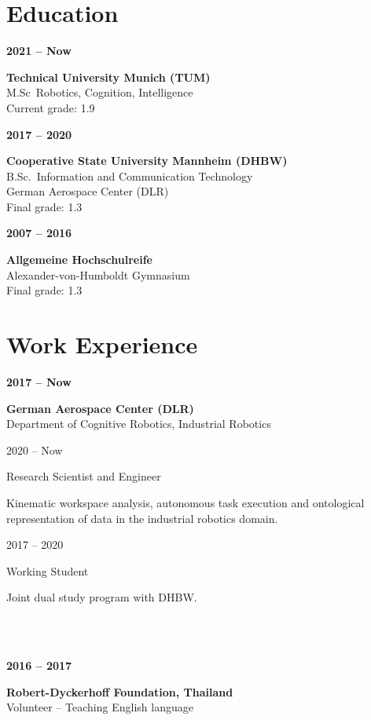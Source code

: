 \documentclass[a4paper, 10pt]{article}
\newcommand{\CVEntry}[3]{
    \begin{minipage}[t]{0.23\textwidth}
        \textbf{#1}
    \end{minipage}%
    \begin{minipage}[t]{0.76\textwidth}
        \textbf{#2}\\
        #3
    \end{minipage}%
}
\newcommand{\CVSubEntry}[2]{
    \begin{minipage}[t]{0.23\textwidth}
        \vspace{3pt}
        \hspace{8pt}#1
    \end{minipage}%
    \begin{minipage}[t]{0.76\textwidth}
        \vspace{3pt}
        #2
    \end{minipage}%
}
\begin{document}
\begin{tcbraster}[raster columns=7]
\begin{tcolorbox}[left=1cm, height=1.0\textheight, colback=white, raster multicolumn=5, boxrule=0pt, frame empty, nobeforeafter]
    \section*{Education}
    \CVEntry{2021 -- Now}{Technical University Munich (TUM)}{
        M.Sc\ Robotics, Cognition, Intelligence\\
        Current grade: 1.9\\
    }
    \CVEntry{2017 -- 2020}{Cooperative State University Mannheim (DHBW)}{
        B.Sc.\ Information and Communication Technology\\
        German Aerospace Center (DLR)\\
        Final grade: 1.3\\
    }
    \CVEntry{2007 -- 2016}{Allgemeine Hochschulreife}{
        Alexander-von-Humboldt Gymnasium\\
        Final grade: 1.3\\
    }
    \vspace{1.5mm}
    \section*{Work Experience}
    \CVEntry{2017 -- Now}{German Aerospace Center (DLR)}{
        Department of Cognitive Robotics, Industrial Robotics
    }%
    \CVSubEntry{2020 -- Now}{
        Research Scientist and Engineer
        {
            \small\begin{spacing}{0.9}
            Kinematic workspace analysis, autonomous task execution and ontological representation of data in the industrial robotics domain.
            \end{spacing}%
            \vspace{2pt}
        }%
    }%
    \CVSubEntry{2017 -- 2020}{
        Working Student
        {
            \small\begin{spacing}{0.9}
            Joint dual study program with DHBW.
            \end{spacing}%
            \vspace{2pt}
        }
    }\\\\
    \CVEntry{2016 -- 2017}{Robert-Dyckerhoff Foundation, Thailand}{
        Volunteer -- Teaching English language\\
    }
    \vspace{1.5mm}
    \printbibliography[title=Publications]

    \vspace{1.5mm}

\end{tcolorbox}
\end{tcbraster}
\end{document}

